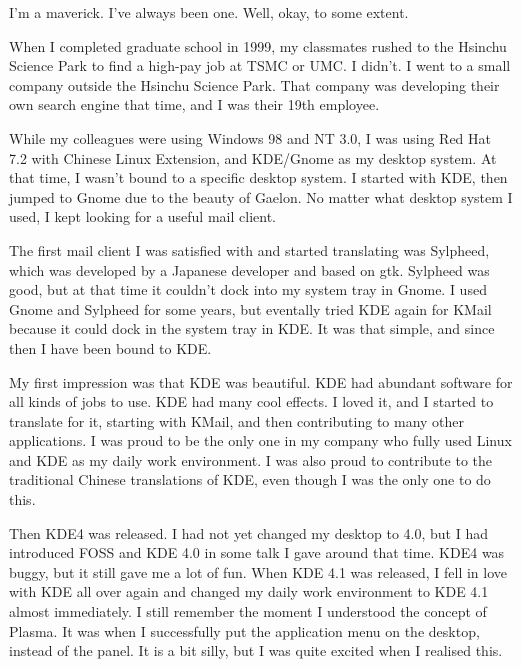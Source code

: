 


\noindent{}I'm a maverick. I've always been one. Well, okay, to some extent.

When I completed graduate school in 1999, my classmates
rushed to the Hsinchu Science Park to find a high-pay job at TSMC
or UMC. I didn't. I went to a small company outside the Hsinchu Science
Park. That company was developing their own search engine that time,
and I was their 19th employee.

While my colleagues were using Windows 98 and NT 3.0, I was using Red Hat
7.2 with Chinese Linux Extension, and KDE/Gnome as my desktop system.
At that time, I wasn't bound to a specific desktop system. I started
with KDE, then jumped to Gnome due to the beauty of Gaelon. No matter what 
desktop system I used, I kept looking for a useful mail client.

The first mail client I was satisfied with and started translating was
Sylpheed, which was developed by a Japanese developer and based on
gtk. Sylpheed was good, but at that time it couldn't dock into my system
tray in Gnome. I used Gnome and Sylpheed for some years, but eventally 
tried KDE again for KMail because it could dock in the system tray in KDE. 
It was that simple, and since then I have been bound to KDE.

My first impression was that KDE was beautiful. KDE had abundant software for all kinds of jobs
to use. KDE had many cool effects. I loved it, and I started to translate
for it, starting with KMail, and then contributing to many other applications. I was proud to
be the only one in my company who fully used Linux and KDE as my daily
work environment. I was also proud to contribute to the traditional
Chinese translations of KDE, even though I was the only one to do
this.

Then KDE4 was released. I had not yet changed my desktop to 4.0,
but I had introduced FOSS and KDE 4.0 in some talk I gave around that time. KDE4
was buggy, but it still gave me a lot of fun. When KDE 4.1 was released, I
fell in love with KDE all over again and changed my daily work environment to
KDE 4.1 almost immediately. I still remember the moment I understood
the concept of Plasma. It was when I successfully put the application
menu on the desktop, instead of the panel. It is a bit silly,
but I was quite excited when I realised this.

